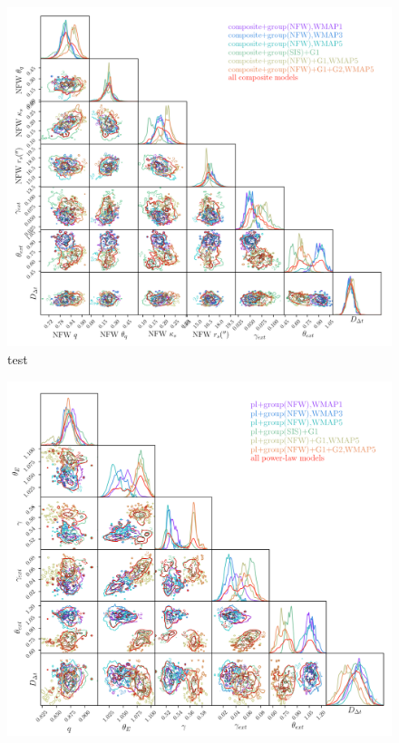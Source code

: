 \documentclass[useAMS,usenatbib]{mnras}
\newcommand\pg{PG\,1115$+$080}
\begin{document}
\begin{figure}
\centering
\includegraphics[scale=0.6]{PG1115_composite.png}
\caption{test}
\label{fig:PG_composite}
\end{figure}

\begin{figure}
\centering
\includegraphics[scale=0.6]{PG1115_powerlaw.png}
\caption{}
\label{fig:PG_pl}
\end{figure}
\end{document}
